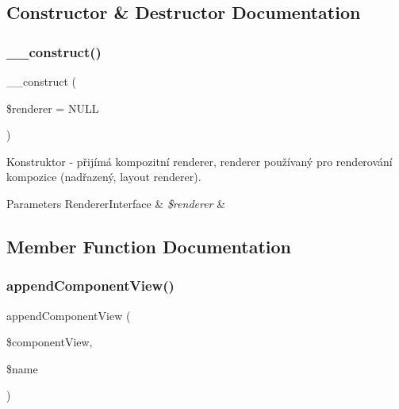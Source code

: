 \subsection{Constructor \& Destructor Documentation}
\mbox{\label{class_pes_1_1_view_1_1_composite_view_af62e04a1fa847074a86af330864028d3}} 
\subsubsection{\texorpdfstring{\+\_\+\+\_\+construct()}{\_\_construct()}}
{\footnotesize\ttfamily \+\_\+\+\_\+construct (\begin{DoxyParamCaption}\item[{\mbox{\hyperlink{interface_pes_1_1_view_1_1_renderer_1_1_renderer_interface}{Renderer\+Interface}}}]{\$renderer = {\ttfamily NULL} }\end{DoxyParamCaption})}

Konstruktor -\/ přijímá kompozitní renderer, renderer používaný pro renderování kompozice (nadřazený, layout renderer).


\begin{DoxyParams}[1]{Parameters}
Renderer\+Interface & {\em \$renderer} & \\
\hline
\end{DoxyParams}


\subsection{Member Function Documentation}
\mbox{\label{class_pes_1_1_view_1_1_composite_view_a2ab16e76a45210ebd3f14c0df914f3b9}} 
\subsubsection{\texorpdfstring{append\+Component\+View()}{appendComponentView()}}
{\footnotesize\ttfamily append\+Component\+View (\begin{DoxyParamCaption}\item[{\mbox{\hyperlink{interface_pes_1_1_view_1_1_view_interface}{View\+Interface}}}]{\$component\+View,  }\item[{}]{\$name }\end{DoxyParamCaption})}

